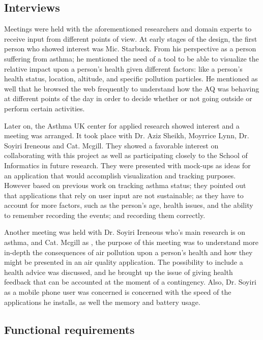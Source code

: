 \subsection{Interviews}

Meetings were held with the aforementioned researchers and domain experts to receive input from different points of view. At early stages of the design, the first person who showed interest was Mic. Starbuck. From his perspective as a person suffering from asthma; he mentioned the need of a tool to be able to visualize the relative impact upon a person's health given different factors: like a person's health status, location, altitude, and specific pollution particles. He mentioned as well that he browsed the web frequently to understand how the AQ was behaving at different points of the day in order to decide whether or not going outside or perform certain activities. 

Later on, the Asthma UK center for applied research showed interest and a meeting was arranged. It took place with Dr. Aziz Sheikh, Moyrrice Lynn, Dr. Soyiri Ireneous and Cat. Mcgill. They showed a favorable interest on collaborating with this project as well as participating closely to the School of Informatics in future research. They were presented with mock-ups as ideas for an application that would accomplish visualization and tracking purposes. However based on previous work on tracking asthma status; they pointed out that applications that rely on user input are not sustainable; as they have to account for more factors, such as the person's age, health issues, and the ability to remember recording the events; and recording them correctly. 

Another meeting was held with Dr. Soyiri Ireneous who's main research is on asthma, and Cat. Mcgill as , the purpose of this meeting was to understand more in-depth the consequences of air pollution upon a person's health and how they might be presented in an air quality application. The possibility to include a health advice was discussed, and he brought up the issue of giving health feedback that can be accounted at the moment of a contingency. Also, Dr. Soyiri as a mobile phone user was concerned is concerned with the speed of the applications he installs, as well the memory and battery usage.


\subsection{Functional requirements}

